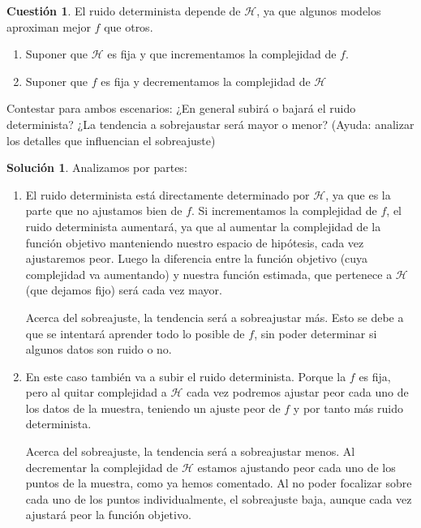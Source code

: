 \documentclass[a4paper, 11pt]{article}
\theoremstyle{definition}
\newtheorem{cuestion}{Cuestión}
\newtheorem*{solucion}{Solución}
\begin{document}
  \begin{cuestion}
    El ruido determinista depende de $\mathcal{H}$, ya que algunos modelos aproximan mejor $f$ que otros.
    \begin{enumerate}
        \item Suponer que $\mathcal{H}$ es fija y que incrementamos la complejidad de $f$.
        \item Suponer que $f$ es fija y decrementamos la complejidad de $\mathcal{H}$
    \end{enumerate}
    Contestar para ambos escenarios: ¿En general subirá o bajará el ruido determinista? ¿La tendencia a sobrejaustar será mayor o menor? (Ayuda: analizar los detalles que influencian el sobreajuste)
  \end{cuestion}

  \begin{solucion}
    Analizamos por partes:
    \begin{enumerate}
      \item El ruido determinista está directamente determinado por $\mathcal{H}$, ya que es la parte que no ajustamos bien de $f$. Si incrementamos la complejidad de $f$, el ruido determinista aumentará, ya que al aumentar la complejidad de la función objetivo manteniendo nuestro espacio de hipótesis, cada vez ajustaremos peor. Luego la diferencia entre la función objetivo (cuya complejidad va aumentando) y nuestra función estimada, que pertenece a $\mathcal{H}$ (que dejamos fijo) será cada vez mayor.

      Acerca del sobreajuste, la tendencia será a sobreajustar más. Esto se debe a que se intentará aprender todo lo posible de $f$, sin poder determinar si algunos datos son ruido o no.
      \item En este caso también va a subir el ruido determinista. Porque la $f$ es fija, pero al quitar complejidad a $\mathcal{H}$ cada vez podremos ajustar peor cada uno de los datos de la muestra, teniendo un ajuste peor de $f$ y por tanto más ruido determinista.

      Acerca del sobreajuste, la tendencia será a sobreajustar menos. Al decrementar la complejidad de $\mathcal{H}$ estamos ajustando peor cada uno de los puntos de la muestra, como ya hemos comentado. Al no poder focalizar sobre cada uno de los puntos individualmente, el sobreajuste baja, aunque cada vez ajustará peor la función objetivo.
    \end{enumerate}
  \end{solucion}
\end{document}
